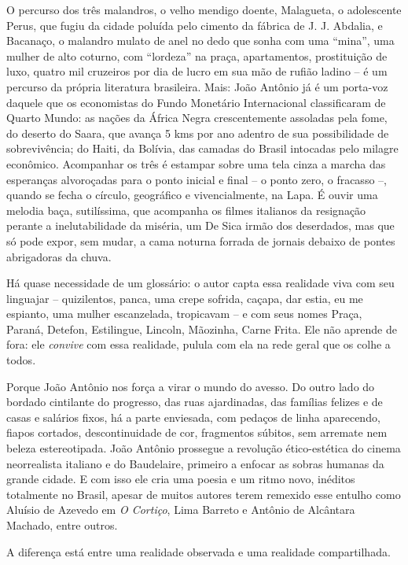 \documentclass[
  letterpaper,
  DIV=11,
  numbers=noendperiod]{scrartcl}
\begin{document}
O percurso dos três malandros, o velho mendigo doente, Malagueta, o
adolescente Perus, que fugiu da cidade poluída pelo cimento da fábrica
de J. J. Abdalia, e Bacanaço, o malandro mulato de anel no dedo que
sonha com uma ``mina'', uma mulher de alto coturno, com ``lordeza'' na
praça, apartamentos, prostituição de luxo, quatro mil cruzeiros por dia
de lucro em sua mão de rufião ladino -- é um percurso da própria
literatura brasileira. Mais: João Antônio já é um porta-voz daquele que
os economistas do Fundo Monetário Internacional classificaram de Quarto
Mundo: as nações da África Negra crescentemente assoladas pela fome, do
deserto do Saara, que avança 5 kms por ano adentro de sua possibilidade
de sobrevivência; do Haiti, da Bolívia, das camadas do Brasil intocadas
pelo milagre econômico. Acompanhar os três é estampar sobre uma tela
cinza a marcha das esperanças alvoroçadas para o ponto inicial e final
-- o ponto zero, o fracasso --, quando se fecha o círculo, geográfico e
vivencialmente, na Lapa. É ouvir uma melodia baça, sutilíssima, que
acompanha os filmes italianos da resignação perante a inelutabilidade da
miséria, um De Sica irmão dos deserdados, mas que só pode expor, sem
mudar, a cama noturna forrada de jornais debaixo de pontes abrigadoras
da chuva.

Há quase necessidade de um glossário: o autor capta essa realidade viva
com seu linguajar -- quizilentos, panca, uma crepe sofrida, caçapa, dar
estia, eu me espianto, uma mulher escanzelada, tropicavam -- e com seus
nomes Praça, Paraná, Detefon, Estilingue, Lincoln, Mãozinha, Carne
Frita. Ele não aprende de fora: ele \emph{convive} com essa realidade,
pulula com ela na rede geral que os colhe a todos.

Porque João Antônio nos força a virar o mundo do avesso. Do outro lado
do bordado cintilante do progresso, das ruas ajardinadas, das famílias
felizes e de casas e salários fixos, há a parte enviesada, com pedaços
de linha aparecendo, fiapos cortados, descontinuidade de cor, fragmentos
súbitos, sem arremate nem beleza estereotipada. João Antônio prossegue a
revolução ético-estética do cinema neorrealista italiano e do
Baudelaire, primeiro a enfocar as sobras humanas da grande cidade. E com
isso ele cria uma poesia e um ritmo novo, inéditos totalmente no Brasil,
apesar de muitos autores terem remexido esse entulho como Aluísio de
Azevedo em \emph{O Cortiço}, Lima Barreto e Antônio de Alcântara
Machado, entre outros.

A diferença está entre uma realidade observada e uma realidade
compartilhada.
\end{document}
